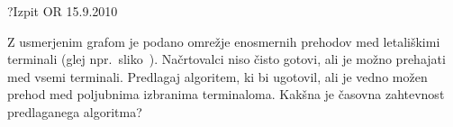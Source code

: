 \begin{naloga}{?}{Izpit OR 15.9.2010}
\begin{vprasanje}
Z usmerjenim grafom je podano omrežje enosmernih prehodov
med letališkimi terminali (glej npr.~sliko~\fig[terminali]).
Načrtovalci niso čisto gotovi, ali je možno prehajati med vsemi terminali.
Predlagaj algoritem, ki bi ugotovil,
ali je vedno možen prehod med poljubnima izbranima terminaloma.
Kakšna je časovna zahtevnost predlaganega algoritma?

\end{vprasanje}
\begin{odgovor}
\end{odgovor}
\end{naloga}
